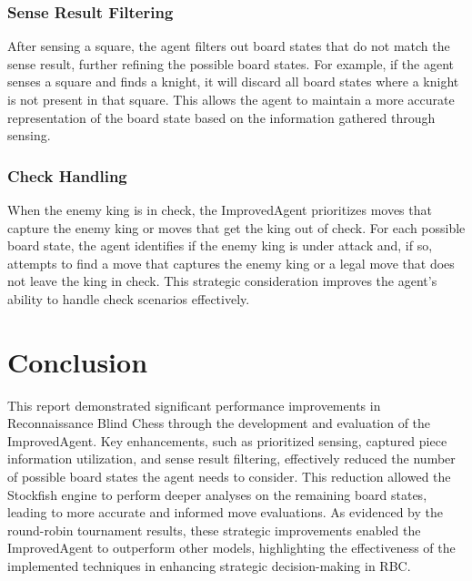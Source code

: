 \documentclass[10pt]{article}
\begin{document}
\subsubsection{Sense Result Filtering}
After sensing a square, the agent filters out board states that do not match the sense result, further refining the possible board states. For example, if the agent senses a square and finds a knight, it will discard all board states where a knight is not present in that square. This allows the agent to maintain a more accurate representation of the board state based on the information gathered through sensing.

\subsubsection{Check Handling}
When the enemy king is in check, the ImprovedAgent prioritizes moves that capture the enemy king or moves that get the king out of check. For each possible board state, the agent identifies if the enemy king is under attack and, if so, attempts to find a move that captures the enemy king or a legal move that does not leave the king in check. This strategic consideration improves the agent's ability to handle check scenarios effectively.

\section{Conclusion}

This report demonstrated significant performance improvements in Reconnaissance Blind Chess through the development and evaluation of the ImprovedAgent. Key enhancements, such as prioritized sensing, captured piece information utilization, and sense result filtering, effectively reduced the number of possible board states the agent needs to consider. This reduction allowed the Stockfish engine to perform deeper analyses on the remaining board states, leading to more accurate and informed move evaluations. As evidenced by the round-robin tournament results, these strategic improvements enabled the ImprovedAgent to outperform other models, highlighting the effectiveness of the implemented techniques in enhancing strategic decision-making in RBC.


    
  
\end{document}
